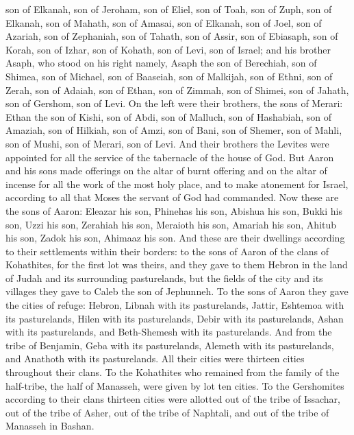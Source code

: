\begin{biblechapter}
\verse son of Elkanah, son of Jeroham, son of Eliel, son of Toah,
\verse son of Zuph, son of Elkanah, son of Mahath, son of Amasai,
\verse son of Elkanah, son of Joel, son of Azariah, son of Zephaniah,
\verse son of Tahath, son of Assir, son of Ebiasaph, son of Korah,
\verse son of Izhar, son of Kohath, son of Levi, son of Israel;
\verse and his brother Asaph, who stood on his right namely, Asaph the son of Berechiah, son of Shimea,
\verse son of Michael, son of Baaseiah, son of Malkijah,
\verse son of Ethni, son of Zerah, son of Adaiah,
\verse son of Ethan, son of Zimmah, son of Shimei,
\verse son of Jahath, son of Gershom, son of Levi.
\verse On the left were their brothers, the sons of Merari: Ethan the son of Kishi, son of Abdi, son of Malluch,
\verse son of Hashabiah, son of Amaziah, son of Hilkiah,
\verse son of Amzi, son of Bani, son of Shemer,
\verse son of Mahli, son of Mushi, son of Merari, son of Levi.
\verse And their brothers the Levites were appointed for all the service of the tabernacle of the house of God.
\verse But Aaron and his sons made offerings on the altar of burnt offering and on the altar of incense for all the work of the most holy place, and to make atonement for Israel, according to all that Moses the servant of God had commanded.
 Now these are the sons of Aaron: Eleazar his son, Phinehas his son, Abishua his son,
\verse Bukki his son, Uzzi his son, Zerahiah his son,
\verse Meraioth his son, Amariah his son, Ahitub his son,
\verse Zadok his son, Ahimaaz his son.
\verse And these are their dwellings according to their settlements within their borders: to the sons of Aaron of the clans of Kohathites, for the first lot was theirs,
\verse and they gave to them Hebron in the land of Judah and its surrounding pasturelands,
\verse but the fields of the city and its villages they gave to Caleb the son of Jephunneh.
\verse To the sons of Aaron they gave the cities of refuge: Hebron, Libnah with its pasturelands, Jattir, Eshtemoa with its pasturelands,
\verse Hilen with its pasturelands, Debir with its pasturelands,
\verse Ashan with its pasturelands, and Beth-Shemesh with its pasturelands.
\verse And from the tribe of Benjamin, Geba with its pasturelands, Alemeth with its pasturelands, and Anathoth with its pasturelands. All their cities were thirteen cities throughout their clans.
\verse To the Kohathites who remained from the family of the half-tribe, the half of Manasseh, were given by lot ten cities.
\verse To the Gershomites according to their clans thirteen cities were allotted out of the tribe of Issachar, out of the tribe of Asher, out of the tribe of Naphtali, and out of the tribe of Manasseh in Bashan.

\end{biblechapter}
